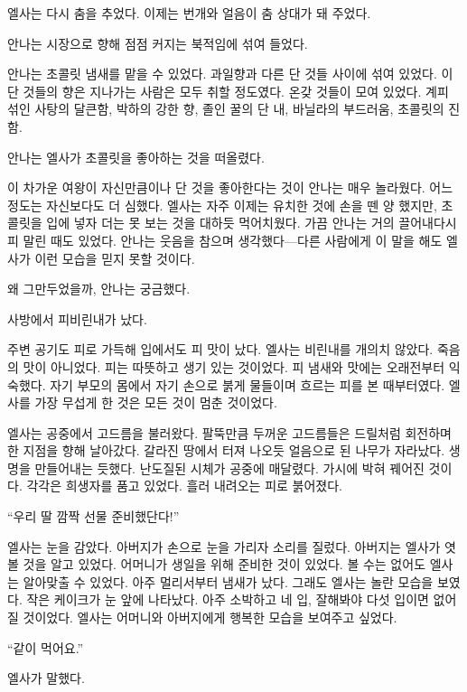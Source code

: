 엘사는 다시 춤을 추었다. 이제는 번개와 얼음이 춤 상대가 돼 주었다.

\textbreak

안나는 시장으로 향해 점점 커지는 북적임에 섞여 들었다.

안나는 초콜릿 냄새를 맡을 수 있었다. 과일향과 다른 단 것들 사이에 섞여 있었다. 이 단 것들의 향은 지나가는 사람은 모두 취할 정도였다. 온갖 것들이 모여 있었다. 계피 섞인 사탕의 달큰함, 박하의 강한 향, 졸인 꿀의 단 내, 바닐라의 부드러움, 초콜릿의 진함.

안나는 엘사가 초콜릿을 좋아하는 것을 떠올렸다.

이 차가운 여왕이 자신만큼이나 단 것을 좋아한다는 것이 안나는 매우 놀라웠다. 어느 정도는 자신보다도 더 심했다. 엘사는 자주 이제는 유치한 것에 손을 뗀 양 했지만, 초콜릿을 입에 넣자 더는 못 보는 것을 대하듯 먹어치웠다. 가끔 안나는 거의 끌어내다시피 말린 때도 있었다. 안나는 웃음을 참으며 생각했다—다른 사람에게 이 말을 해도 엘사가 이런 모습을 믿지 못할 것이다.

왜 그만두었을까, 안나는 궁금했다.

\textbreak

사방에서 피비린내가 났다.

주변 공기도 피로 가득해 입에서도 피 맛이 났다. 엘사는 비린내를 개의치 않았다. 죽음의 맛이 아니었다. 피는 따뜻하고 생기 있는 것이었다. 피 냄새와 맛에는 오래전부터 익숙했다. 자기 부모의 몸에서 자기 손으로 붉게 물들이며 흐르는 피를 본 때부터였다. 엘사를 가장 무섭게 한 것은 모든 것이 멈춘 것이었다.

엘사는 공중에서 고드름을 불러왔다. 팔뚝만큼 두꺼운 고드름들은 드릴처럼 회전하며 한 지점을 향해 날아갔다. 갈라진 땅에서 터져 나오듯 얼음으로 된 나무가 자라났다. 생명을 만들어내는 듯했다. 난도질된 시체가 공중에 매달렸다. 가시에 박혀 꿰어진 것이다. 각각은 희생자를 품고 있었다. 흘러 내려오는 피로 붉어졌다.  %

``우리 딸 깜짝 선물 준비했단다!''

엘사는 눈을 감았다. 아버지가 손으로 눈을 가리자 소리를 질렀다. 아버지는 엘사가 엿볼 것을 알고 있었다. 어머니가 생일을 위해 준비한 것이 있었다. 볼 수는 없어도 엘사는 알아맞출 수 있었다. 아주 멀리서부터 냄새가 났다. 그래도 엘사는 놀란 모습을 보였다. 작은 케이크가 눈 앞에 나타났다. 아주 소박하고 네 입, 잘해봐야 다섯 입이면 없어질 것이었다. 엘사는 어머니와 아버지에게 행복한 모습을 보여주고 싶었다.

``같이 먹어요.''

엘사가 말했다.

